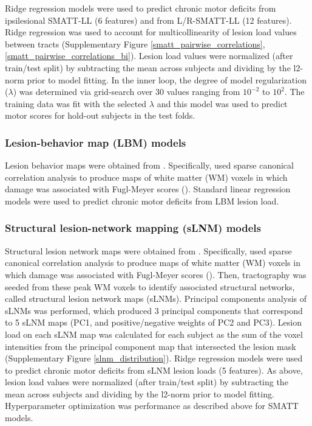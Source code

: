 \documentclass[10pt]{article}
\begin{document}
Ridge regression models were used to predict chronic motor deficits from ipsilesional SMATT-LL (6 features) and from L/R-SMATT-LL (12 features). Ridge regression was used to account for multicollinearity of lesion load values between tracts (Supplementary Figure \ref{smatt_pairwise_correlations}, \ref{smatt_pairwise_correlations_bi}). Lesion load values were normalized (after train/test split) by subtracting the mean across subjects and dividing by the l2-norm prior to model fitting. In the inner loop, the degree of model regularization  ($\lambda$) was determined via grid-search over 30 values ranging from $10^{-2}$ to $10^2$. The training data was fit with the selected $\lambda$ and this model was used to predict motor scores for hold-out subjects in the test folds.

\subsubsection*{Lesion-behavior map (LBM) models}
Lesion behavior maps were obtained from \cite{Bowren2022-rs}. Specifically, \cite{Bowren2022-rs} used sparse canonical correlation analysis to produce maps of white matter (WM) voxels in which damage was associated with Fugl-Meyer scores (\cite{Pustina2018-xv}). Standard linear regression models were used to predict chronic motor deficits from LBM lesion load. 

\subsubsection*{Structural lesion-network mapping (sLNM) models}
Structural lesion network maps were obtained from \cite{Bowren2022-rs}. Specifically, \cite{Bowren2022-rs} used sparse canonical correlation analysis to produce maps of white matter (WM) voxels in which damage was associated with Fugl-Meyer scores (\cite{Pustina2018-xv}). Then, tractography was seeded from these peak WM voxels to identify associated structural networks, called structural lesion network maps (sLNMs). Principal components analysis of sLNMs was performed, which produced 3 principal components that correspond to 5 sLNM maps (PC1, and positive/negative weights of PC2 and PC3). Lesion load on each sLNM map was calculated for each subject as the sum of the voxel intensities from the principal component map that intersected the lesion mask (Supplementary Figure \ref{slnm_distribution}). Ridge regression models were used to predict chronic motor deficits from sLNM lesion loads (5 features). As above, lesion load values were normalized (after train/test split) by subtracting the mean across subjects and dividing by the l2-norm prior to model fitting. Hyperparameter optimization was performance as described above for SMATT models.
\end{document}

